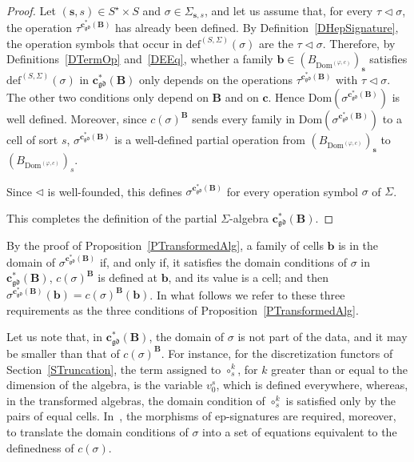 \documentclass[a4paper, reqno
]{amsart}
\newcommand{\Dom}{\mathrm{Dom}}
\newcommand{\gd}{\mathfrak{gd}}              %
\theoremstyle{plain}
\theoremstyle{definition}
\begin{document}
\begin{proof}
Let $(\mathbf{s},s)\in S^{\star}\times S$ and $\sigma\in\Sigma_{\mathbf{s},s}$, and let us assume that, for every $\tau\lhd\sigma$, the operation $\tau^{\mathbf{c}^{\ast}_{\gd}(\mathbf{B})}$ has already been defined.
By Definition~\ref{DHepSignature}, the operation symbols that occur in $\mathrm{def}^{(S,\Sigma)}(\sigma)$ are the $\tau\lhd\sigma$.
Therefore, by Definitions~\ref{DTermOp} and~\ref{DEEq}, whether a family $\mathbf{b}\in(B_{\Dom^{(\varphi,c)}})_{\mathbf{s}}$ satisfies $\mathrm{def}^{(S,\Sigma)}(\sigma)$ in $\mathbf{c}^{\ast}_{\gd}(\mathbf{B})$ only depends on the operations $\tau^{\mathbf{c}^{\ast}_{\gd}(\mathbf{B})}$ with $\tau\lhd\sigma$.
The other two conditions only depend on $\mathbf{B}$ and on $\mathbf{c}$.
Hence $\Dom(\sigma^{\mathbf{c}^{\ast}_{\gd}(\mathbf{B})})$ is well defined.
Moreover, since $c(\sigma)^{\mathbf{B}}$ sends every family in $\Dom(\sigma^{\mathbf{c}^{\ast}_{\gd}(\mathbf{B})})$ to a cell of sort $s$, $\sigma^{\mathbf{c}^{\ast}_{\gd}(\mathbf{B})}$ is a well-defined partial operation from $(B_{\Dom^{(\varphi,c)}})_{\mathbf{s}}$ to $(B_{\Dom^{(\varphi,c)}})_{s}$.

Since $\lhd$ is well-founded, this defines $\sigma^{\mathbf{c}^{\ast}_{\gd}(\mathbf{B})}$ for every operation symbol $\sigma$ of $\Sigma$.

This completes the definition of the partial $\Sigma$-algebra $\mathbf{c}^{\ast}_{\gd}(\mathbf{B})$.
\end{proof}

By the proof of Proposition~\ref{PTransformedAlg}, a family of cells $\mathbf{b}$ is in the domain of $\sigma^{\mathbf{c}^{\ast}_{\gd}(\mathbf{B})}$ if, and only if, it satisfies the domain conditions of $\sigma$ in $\mathbf{c}^{\ast}_{\gd}(\mathbf{B})$, $c(\sigma)^{\mathbf{B}}$ is defined at $\mathbf{b}$, and its value is a cell; and then $\sigma^{\mathbf{c}^{\ast}_{\gd}(\mathbf{B})}(\mathbf{b})=c(\sigma)^{\mathbf{B}}(\mathbf{b})$.
In what follows we refer to these three requirements as the three conditions of Proposition~\ref{PTransformedAlg}.

Let us note that, in $\mathbf{c}^{\ast}_{\gd}(\mathbf{B})$, the domain of $\sigma$ is not part of the data, and it may be smaller than that of $c(\sigma)^{\mathbf{B}}$.
For instance, for the discretization functors of Section~\ref{STruncation}, the term assigned to $\circ^{k}_{s}$, for $k$ greater than or equal to the dimension of the algebra, is the variable $v^{s}_{0}$, which is defined everywhere, whereas, in the transformed algebras, the domain condition of $\circ^{k}_{s}$ is satisfied only by the pairs of equal cells.
In~\cite{Rei87}, the morphisms of ep-signatures are required, moreover, to translate the domain conditions of $\sigma$ into a set of equations equivalent to the definedness of $c(\sigma)$.
\end{document}
